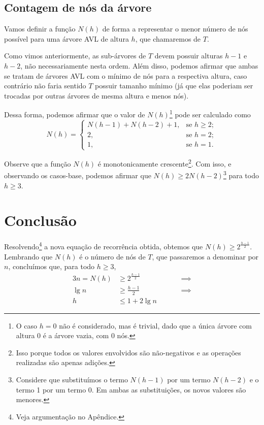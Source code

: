 \documentclass[10pt,a4paper,twoside]{article}
\theoremstyle{definition}
\begin{document}
    \subsection{Contagem de nós da árvore}
      \label{str:contagem-nos}

      Vamos definir a função \( N(h) \) de forma a representar o menor número de nós possível para uma árvore AVL de altura \( h \), que chamaremos de \( T \).

      Como vimos anteriormente, as sub-árvores de \( T \) devem possuir alturas \( h-1 \) e \( h-2 \), não necessariamente nesta ordem. Além disso, podemos afirmar que ambas se tratam de árvores AVL com o mínimo de nós para a respectiva altura, caso contrário não faria sentido \( T \) possuir tamanho mínimo (já que elas poderiam ser trocadas por outras árvores de mesma altura e menos nós).

      Dessa forma, podemos afirmar que o valor de \( N(h) \)\footnote{O caso \( h = 0 \) não é considerado, mas é trivial, dado que a única árvore com altura 0 é a árvore vazia, com 0 nós.} pode ser calculado como \[ N(h) = \begin{cases}
          N(h-1) + N(h-2) + 1, & \text{se } h \geq 2; \\
          2                  , & \text{se } h = 2;    \\
          1                  , & \text{se } h = 1.
        \end{cases} \]

      Observe que a função \( N(h) \) é monotonicamente crescente\footnote{Isso porque todos os valores envolvidos são não-negativos e as operações realizadas são apenas adições.}. Com isso, e observando os casos-base, podemos afirmar que \( N(h) \geq 2N(h-2) \)\footnote{Considere que substituímos o termo \( N(h-1) \) por um termo \( N(h-2) \) e o termo 1 por um termo 0. Em ambas as substituições, os novos valores são menores.} para todo \( h \geq 3 \).

    \section{Conclusão}

     Resolvendo\footnote{Veja argumentação no Apêndice.} a nova equação de recorrência obtida, obtemos que \( N(h) \geq 2^{\frac{h-1}{2}} \). Lembrando que \( N(h) \) é o número de nós de \( T \), que passaremos a denominar por \( n \), concluímos que, para todo \( h \geq 3 \),
     \begin{alignat*}{3}
       n = N(h) & \geq 2^{\frac{h-1}{2}} & \quad &  & \implies \\
       \lg n    & \geq \frac{h-1}{2}     & \quad &  & \implies \\
       h        & \leq 1 + 2 \lg n       & \quad &  &
     \end{alignat*}
\end{document}
